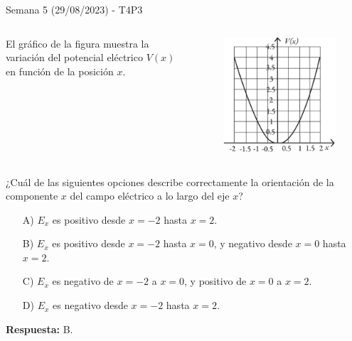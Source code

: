 \begin{frame}{Semana 5 (29/08/2023) - T4P3}
    
    \vspace{-1em}
    
    \begin{columns}
    El gráfico de la figura muestra la variación del potencial eléctrico $V(x)$ en función de la posición $x$.
    \begin{figure}
        \centering
        \includegraphics[scale=0.3]{figures/t4p3.png}
    \end{figure}
    \end{columns}
    
    \vspace{1em}
    
    ¿Cuál de las siguientes opciones describe correctamente la orientación de la componente $x$ del campo eléctrico a lo largo del eje $x$?
    
    \begin{itemize}
        \item[A)] $E_x$ es positivo desde $x = -2$ hasta $x = 2$.

        \item[B)] $E_x$ es positivo desde $x = -2$ hasta $x = 0$, y negativo desde $x = 0$ hasta $x = 2$.
        
        \item[C)] $E_x$ es negativo de $x = -2$ a $x = 0$, y positivo de $x = 0$ a $x = 2$.
        
        \item[D)] $E_x$ es negativo desde $x = -2$ hasta $x = 2$.
    \end{itemize}
    
    \pause \begin{center}
        \textbf{Respuesta:} B.
    \end{center}
    
\end{frame}

